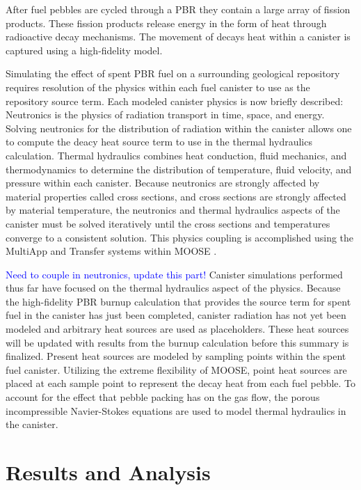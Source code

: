 \documentclass{anstrans}
\newcommand{\blue}[1]{\textcolor{blue}{#1}}
\begin{document}
After fuel pebbles are cycled through a PBR they contain a large array of fission products.
These fission products release energy in the form of heat through radioactive decay mechanisms.
The movement of decays heat within a canister is captured using a high-fidelity model.

Simulating the effect of spent PBR fuel on a surrounding geological repository requires resolution of the physics within each fuel canister to use as the repository source term.
Each modeled canister physics is now briefly described: Neutronics is the physics of radiation transport in time, space, and energy.
Solving neutronics for the distribution of radiation within the canister allows one to compute the deacy heat source term to use in the thermal hydraulics calculation.
Thermal hydraulics combines heat conduction, fluid mechanics, and thermodynamics to determine the distribution of temperature, fluid velocity, and pressure within each canister.
Because neutronics are strongly affected by material properties called cross sections, and cross sections are strongly affected by material temperature, the neutronics and thermal hydraulics aspects of the canister must be solved iteratively until the cross sections and temperatures converge to a consistent solution.
This physics coupling is accomplished using the MultiApp and Transfer systems within MOOSE \cite{multiapp}.

\blue{Need to couple in neutronics, update this part!}
Canister simulations performed thus far have focused on the thermal hydraulics aspect of the physics.
Because the high-fidelity PBR burnup calculation that provides the source term for spent fuel in the canister has just been completed, canister radiation has not yet been modeled and arbitrary heat sources are used as placeholders.
These heat sources will be updated with results from the burnup calculation before this summary is finalized.
Present heat sources are modeled by sampling points within the spent fuel canister.
Utilizing the extreme flexibility of MOOSE, point heat sources are placed at each sample point to represent the decay heat from each fuel pebble.
To account for the effect that pebble packing has on the gas flow, the porous incompressible Navier-Stokes equations are used to model thermal hydraulics in the canister.



\section{Results and Analysis}
\end{document}
